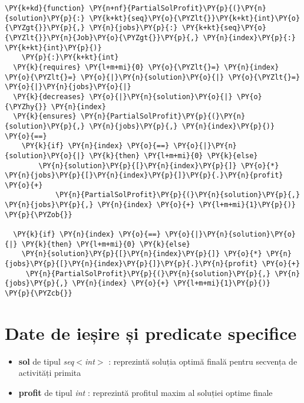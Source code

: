 \begin{Verbatim}[commandchars=\\\{\},fontsize=\small]
\PY{k+kd}{function} \PY{n+nf}{PartialSolProfit}\PY{p}{(}\PY{n}{solution}\PY{p}{:} \PY{k+kt}{seq}\PY{o}{\PYZlt{}}\PY{k+kt}{int}\PY{o}{\PYZgt{}}\PY{p}{,} \PY{n}{jobs}\PY{p}{:} \PY{k+kt}{seq}\PY{o}{\PYZlt{}}\PY{n}{Job}\PY{o}{\PYZgt{}}\PY{p}{,} \PY{n}{index}\PY{p}{:} \PY{k+kt}{int}\PY{p}{)}
    \PY{p}{:}\PY{k+kt}{int}
  \PY{k}{requires} \PY{l+m+mi}{0} \PY{o}{\PYZlt{}=} \PY{n}{index} \PY{o}{\PYZlt{}=} \PY{o}{|}\PY{n}{solution}\PY{o}{|} \PY{o}{\PYZlt{}=} \PY{o}{|}\PY{n}{jobs}\PY{o}{|}
  \PY{k}{decreases} \PY{o}{|}\PY{n}{solution}\PY{o}{|} \PY{o}{\PYZhy{}} \PY{n}{index}
  \PY{k}{ensures} \PY{n}{PartialSolProfit}\PY{p}{(}\PY{n}{solution}\PY{p}{,} \PY{n}{jobs}\PY{p}{,} \PY{n}{index}\PY{p}{)} \PY{o}{==} 
    \PY{k}{if} \PY{n}{index} \PY{o}{==} \PY{o}{|}\PY{n}{solution}\PY{o}{|} \PY{k}{then} \PY{l+m+mi}{0} \PY{k}{else}
        \PY{n}{solution}\PY{p}{[}\PY{n}{index}\PY{p}{]} \PY{o}{*} \PY{n}{jobs}\PY{p}{[}\PY{n}{index}\PY{p}{]}\PY{p}{.}\PY{n}{profit} \PY{o}{+} 
            \PY{n}{PartialSolProfit}\PY{p}{(}\PY{n}{solution}\PY{p}{,} \PY{n}{jobs}\PY{p}{,} \PY{n}{index} \PY{o}{+} \PY{l+m+mi}{1}\PY{p}{)}
\PY{p}{\PYZob{}}

  \PY{k}{if} \PY{n}{index} \PY{o}{==} \PY{o}{|}\PY{n}{solution}\PY{o}{|} \PY{k}{then} \PY{l+m+mi}{0} \PY{k}{else} 
    \PY{n}{solution}\PY{p}{[}\PY{n}{index}\PY{p}{]} \PY{o}{*} \PY{n}{jobs}\PY{p}{[}\PY{n}{index}\PY{p}{]}\PY{p}{.}\PY{n}{profit} \PY{o}{+}
     \PY{n}{PartialSolProfit}\PY{p}{(}\PY{n}{solution}\PY{p}{,} \PY{n}{jobs}\PY{p}{,} \PY{n}{index} \PY{o}{+} \PY{l+m+mi}{1}\PY{p}{)}
\PY{p}{\PYZcb{}}
\end{Verbatim}

\section{Date de ieșire și predicate specifice }
\begin{itemize}
    \item \textbf{sol} de tipul {\textit{seq$<$int$>$}} : reprezintă soluția optimă finală pentru secvența de activități primita 
    \item \textbf{profit} de tipul \textit{int} : reprezintă profitul maxim al soluției optime finale
\end{itemize}

